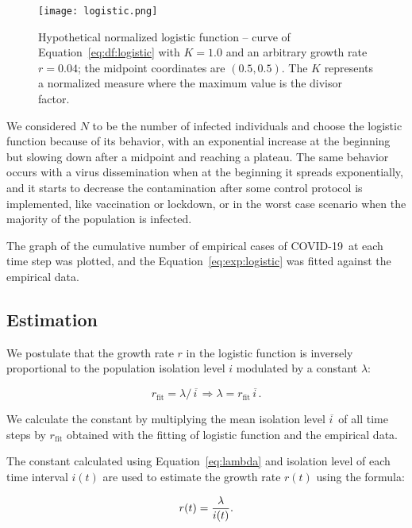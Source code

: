 \documentclass[times]{article}
\def\covid{\hbox{COVID-19}} %
\def\eq#1{Equation~#1}
\begin{document}
\begin{figure}
\centering
\texttt{[image: logistic.png]}
\caption{Hypothetical normalized logistic function -- 
curve of \eq{\ref{eq:df:logistic}} with 
$K=1.0$ and an arbitrary growth rate $r=0.04$; 
the midpoint coordinates are $(0.5, 0.5)$.
The $K$ represents a normalized measure where 
the maximum value is the divisor factor.}
\label{fig:logistic}
\end{figure}

We considered $N$ to be the number of infected individuals 
and choose the logistic function because of its behavior, 
with an exponential increase at the beginning but slowing down after 
a  midpoint and reaching a plateau. 
The same behavior occurs with a virus dissemination when at the 
beginning it spreads exponentially, and it starts to 
decrease the contamination after some control protocol is implemented, 
like vaccination or lockdown, 
or in the worst case scenario when the majority of the population is infected.

The graph of the cumulative number of empirical cases of \covid\ 
at each time step was plotted, 
and the \eq{\ref{eq:exp:logistic}} was fitted against the 
empirical data.

\subsection{Estimation}

We postulate that the growth rate $r$ in the logistic function is 
inversely proportional to the population isolation level $i$ 
modulated by a constant $\lambda$:

\begin{equation}
r_{\text{fit}} = {\lambda /\, \overline{i\,}} \Rightarrow \lambda = r_{\text{fit}}\, \overline{i\,}.
\label{eq:lambda}
\end{equation}

We calculate the constant by multiplying 
the mean isolation level $\overline{i\,}$  
of all time steps by 
$r_{\text{fit}}$ obtained with the fitting of 
logistic function and the empirical data.

The constant calculated using \eq{\ref{eq:lambda}}
and isolation level of each time interval $i(t)$ 
are used to estimate the growth rate $r(t)$ using the formula:

\begin{equation}
r(t) = {\lambda\over i(t)}.
\label{eq:rt}
\end{equation}
\end{document}

